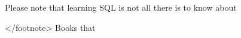 % 
% 
% 

% 

Please note that learning SQL is not all there is to know about 

</footnote>  Books that
% 
% 
% 

% 
% 
% 
% 
% 

% 

% 
% 

% 
% 

% 
% 
% 
% 
% 

% 
% 
% 

